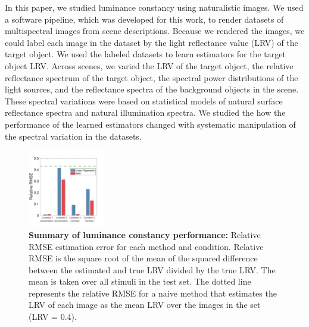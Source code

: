 \documentclass{jov}
\begin{document}
In this paper, we studied luminance constancy using naturalistic images.
We used a software pipeline, which was developed for this work, to render datasets of multispectral images from scene descriptions.
Because we rendered the images, we could label each image in the dataset by the light reflectance value (LRV) of the target object.
We used the labeled datasets to learn estimators for the target object LRV.
Across scenes, we varied the LRV of the target object, the relative reflectance spectrum of the target object, 
the spectral power distributions of the light sources, and the reflectance spectra of the background objects in the scene.
These spectral variations were based on statistical models of natural surface reflectance spectra and natural illumination spectra.
We studied the how the performance of the learned estimators changed with systematic manipulation of the spectral variation in the datasets.

\begin{figure}
\centering
\includegraphics[width=0.3\textwidth]{../FiguresDraft5/Figure14/Figure14.pdf}
\caption{{\bf Summary of luminance constancy performance:} Relative RMSE estimation error for each method and condition. Relative RMSE is the square root of the mean of the squared difference between the estimated and true LRV divided by the true LRV. The mean is taken over all stimuli in the test set. The dotted line represents the relative RMSE for a naive method that estimates the LRV of each image as the mean LRV over the images in the set (LRV = 0.4).}
 \label{fig:barGraphs}
\end{figure}
\end{document}

